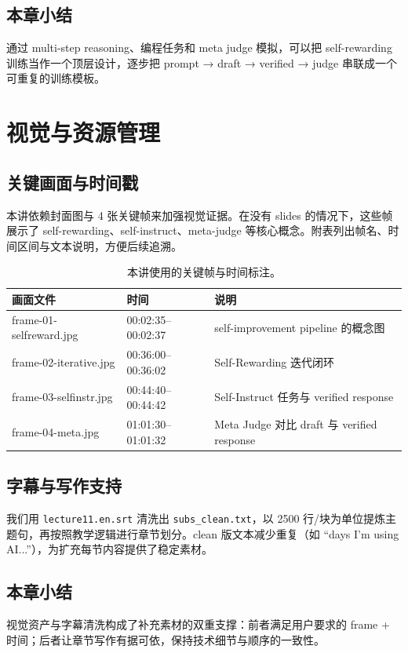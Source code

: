 \documentclass[a4paper]{article}
\begin{document}
\subsection{本章小结}
通过 multi-step reasoning、编程任务和 meta judge 模拟，可以把 self-rewarding 训练当作一个顶层设计，逐步把 prompt → draft → verified → judge 串联成一个可重复的训练模板。

\section{视觉与资源管理}
\subsection{关键画面与时间戳}
本讲依赖封面图与 4 张关键帧来加强视觉证据。在没有 slides 的情况下，这些帧展示了 self-rewarding、self-instruct、meta-judge 等核心概念。附表列出帧名、时间区间与文本说明，方便后续追溯。

\begin{table}[H]
\centering
\begin{tabular}{p{3cm}p{3cm}p{7cm}}
\toprule
画面文件 & 时间 & 说明 \\
\midrule
frame-01-selfreward.jpg & 00:02:35--00:02:37 & self-improvement pipeline 的概念图 \\
frame-02-iterative.jpg & 00:36:00--00:36:02 & Self-Rewarding 迭代闭环 \\
frame-03-selfinstr.jpg & 00:44:40--00:44:42 & Self-Instruct 任务与 verified response \\
frame-04-meta.jpg & 01:01:30--01:01:32 & Meta Judge 对比 draft 与 verified response \\
\bottomrule
\end{tabular}
\caption{本讲使用的关键帧与时间标注。}
\end{table}

\subsection{字幕与写作支持}
我们用 \texttt{lecture11.en.srt} 清洗出 \texttt{subs\_clean.txt}，以 2500 行/块为单位提炼主题句，再按照教学逻辑进行章节划分。clean 版文本减少重复（如 ``days I'm using AI...''），为扩充每节内容提供了稳定素材。

\subsection{本章小结}
视觉资产与字幕清洗构成了补充素材的双重支撑：前者满足用户要求的 frame + 时间；后者让章节写作有据可依，保持技术细节与顺序的一致性。
\end{document}
